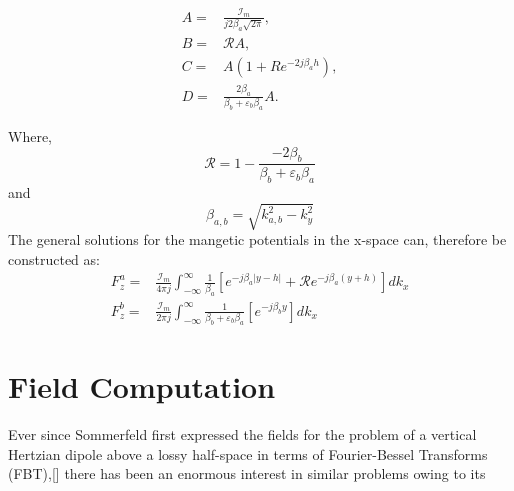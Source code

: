 \documentclass{article}
\begin{document}
  \begin{subequations}
    \begin{align}
      A ={}& \frac{\mathcal{I}_m}{j2\beta_a \sqrt{2\pi}}, \\
      B ={}& \mathcal{R} A, \\
      C ={}& A \left( 1 + Re^{-2j\beta_a h} \right), \\
      D ={}& \frac{2\beta_a}{\beta_b + \varepsilon_b \beta_a} A.
    \end{align}
  \end{subequations}

  Where,
  \begin{equation}
    \mathcal{R} = 1 - \frac{-2\beta_b}{\beta_b + \varepsilon_b \beta_a}
  \end{equation}
  and
  \begin{equation}
    \beta_{a,b} = \sqrt{k_{a,b}^2 - k_y^2}
  \end{equation}
The general solutions for the mangetic potentials in the x-space can, therefore be constructed as:
\begin{subequations}
  \begin{align}
    F_z^a ={}& \frac{\mathcal{I}_m}{4 \pi j}\int_{-\infty}^{\infty} \frac{1}{\beta_a} \left[ e^{-j \beta_a |y - h|} + \mathcal{R} e^{-j \beta_a (y + h)} \right] dk_x \\
    F_z^b ={}& \frac{\mathcal{I}_m}{2 \pi j}\int_{-\infty}^{\infty} \frac{1}{\beta_b + \varepsilon_b \beta_a} \left[e^{-j \beta_b y} \right] dk_x
  \end{align}
  \label{eq:potentials}
\end{subequations}

\section{Field Computation}

Ever since Sommerfeld first expressed the fields for the problem of a vertical Hertzian dipole above a lossy half-space in terms of Fourier-Bessel Transforms (FBT),[\cite{Sommerfeld}] there has been an enormous interest in similar problems owing to its




% 
% 
\end{document}
